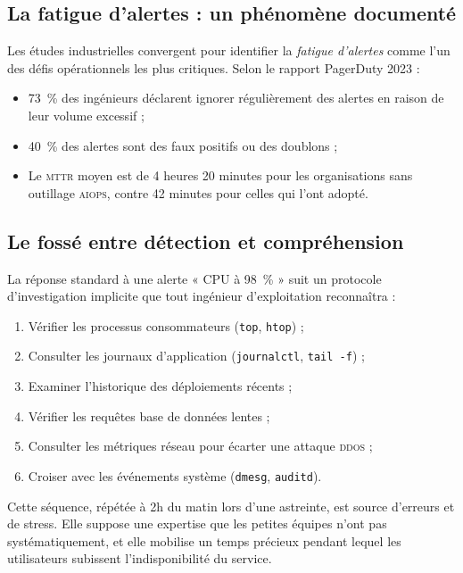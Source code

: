 \subsection{La fatigue d'alertes : un phénomène documenté}

Les études industrielles convergent pour identifier la \textit{fatigue d'alertes}
comme l'un des défis opérationnels les plus critiques. Selon le rapport PagerDuty
2023 \cite{pagerduty2023} :

\begin{itemize}
  \item 73~\% des ingénieurs déclarent ignorer régulièrement des alertes en raison
    de leur volume excessif ;
  \item 40~\% des alertes sont des faux positifs ou des doublons ;
  \item Le \textsc{mttr} moyen est de 4 heures 20 minutes pour les organisations
    sans outillage \textsc{aiops}, contre 42 minutes pour celles qui l'ont adopté.
\end{itemize}

\subsection{Le fossé entre détection et compréhension}

La réponse standard à une alerte « CPU à 98~\% » suit un protocole d'investigation
implicite que tout ingénieur d'exploitation reconnaîtra :

\begin{enumerate}
  \item Vérifier les processus consommateurs (\texttt{top}, \texttt{htop}) ;
  \item Consulter les journaux d'application (\texttt{journalctl}, \texttt{tail -f}) ;
  \item Examiner l'historique des déploiements récents ;
  \item Vérifier les requêtes base de données lentes ;
  \item Consulter les métriques réseau pour écarter une attaque \textsc{ddos} ;
  \item Croiser avec les événements système (\texttt{dmesg}, \texttt{auditd}).
\end{enumerate}

Cette séquence, répétée à 2h du matin lors d'une astreinte, est source d'erreurs
et de stress. Elle suppose une expertise que les petites équipes n'ont pas
systématiquement, et elle mobilise un temps précieux pendant lequel les utilisateurs
subissent l'indisponibilité du service.

